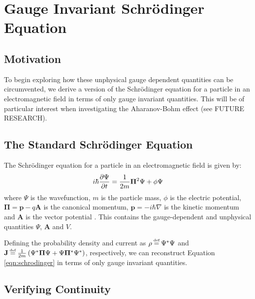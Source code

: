 \section{Gauge Invariant Schr\"odinger Equation}
\label{sec:gise}

\subsection{Motivation}

To begin exploring how these unphysical gauge dependent quantities can be
circumvented, we derive a version of the Schr\"odinger equation for a particle
in an electromagnetic field in terms of only gauge invariant quantities. This
will be of particular interest when investigating the Aharanov-Bohm effect (see
FUTURE RESEARCH).

\subsection{The Standard Schr\"odinger Equation}

The Schr\"odinger equation for a particle in an electromagnetic field is given
by:
\begin{align}
    i \hbar \frac{\partial \Psi}{\partial t} = \frac{1}{2m}\mathbf{\Pi}^2 \Psi + \phi \Psi
    \label{eqn:schrodinger}
\end{align}
where $\Psi$ is the wavefunction, $m$ is the particle mass, $\phi$ is the
electric potential, $\mathbf{\Pi} = \mathbf{p} - q\mathbf{A}$ is the canonical
momentum, $\mathbf{p} = - i \hbar \nabla$ is the kinetic momentum and
$\mathbf{A}$ is the vector potential \cite[Ch. 4]{aharonov-rohrlich-2008}. This
contains the gauge-dependent and unphysical quantities $\Psi$, $\mathbf{A}$ and
$V$.

Defining the probability density and current as $\rho \defeq \Psi^*\Psi$ and
$\mathbf{J} \defeq \frac{1}{2m}\left( \Psi^* \mathbf{\Pi} \Psi + \Psi
\mathbf{\Pi}^* \Psi^* \right)$, respectively, we can reconstruct Equation
\ref{eqn:schrodinger} in terms of only gauge invariant quantities.

\subsection{Verifying Continuity}

